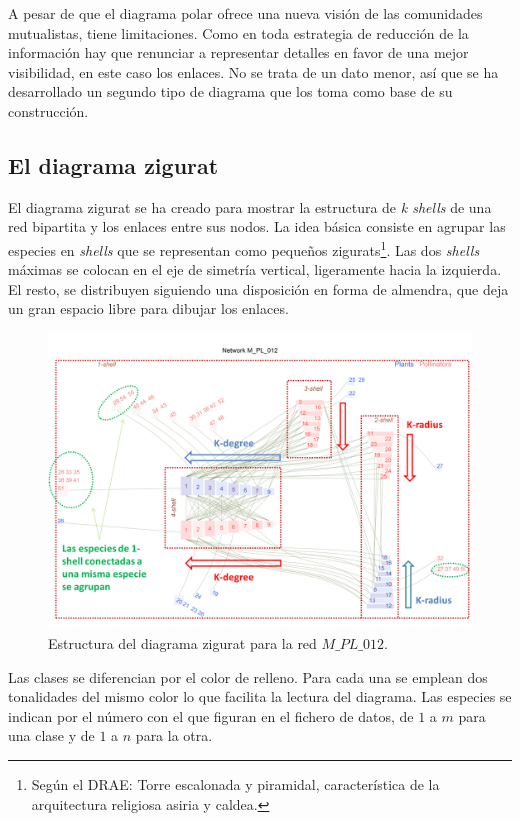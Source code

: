 A pesar de que el diagrama polar ofrece una nueva visión de las comunidades mutualistas, tiene limitaciones. Como en toda estrategia de reducción de la información hay que renunciar a representar detalles en favor de una mejor visibilidad, en este caso los enlaces. No se trata de un dato menor, así que se ha desarrollado un segundo tipo de diagrama que los toma como base de su construcción.

\clearpage
\subsection{El diagrama zigurat}
\label{sec:diagrama_zigurat}

El diagrama zigurat se ha creado para mostrar la estructura de \textit{k shells} de una red bipartita y los enlaces entre sus nodos. La idea básica consiste en agrupar las especies en \textit{shells} que se representan como pequeños zigurats\footnote{Según el DRAE: Torre escalonada y piramidal, característica de la arquitectura religiosa asiria y caldea.}. Las dos \textit{shells} máximas se colocan en el eje de simetría vertical, ligeramente hacia la izquierda. El resto, se distribuyen siguiendo una disposición en forma de almendra, que deja un gran espacio libre para dibujar los enlaces.

\begin{figure}[h!]
\centering
\includegraphics[scale=0.4]{Figures/VIS_explicacion_zigurat.png}
\caption {Estructura del diagrama zigurat para la red  $M\_PL\_012$.}
\label{fig:VIS_explicacion_zigurat}
\end{figure}

Las clases se diferencian por el color de relleno. Para cada una se emplean dos tonalidades del mismo color lo que facilita la lectura del diagrama. Las especies se indican por el número
con el que figuran en el fichero de datos, de $1$ a $m$ para una clase y de $1$ a $n$ para la otra.

